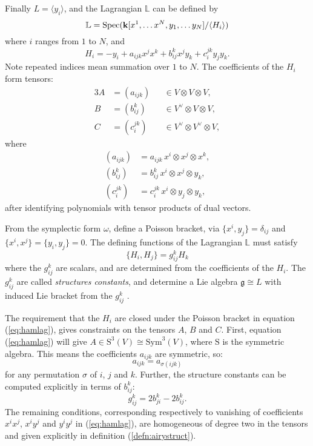     
    Finally \(L=\langle y_i \rangle \), and the Lagrangian \(\mathbb{L}\) can be defined by
    \[\mathbb{L}=\mathrm{Spec}( \mathbf{k}[x^1, \dots x^N, y_1, \dots y_N]/\langle H_i \rangle)\]
    where \(i \) ranges from \(1\) to \(N\), and
    \[ H_i=-y_i+a_{ijk}x^jx^k+b_{ij}^kx^jy_k+c_i^{jk}y_jy_k.
    \]
    Note repeated indices mean summation over \( 1\) to \(N\). The coefficients of the \(H_i\) form tensors:
    \begin{alignat*}{3}
    A &=(a_{ijk})  && \in V\otimes V\otimes V,\nonumber\\
    B &=(b_{ij}^k) && \in V^{\vee} \otimes V\otimes V,\\   
    C &=(c_i^{jk}) && \in V^{\vee} \otimes V^{\vee} \otimes V,\nonumber
    \end{alignat*}
    where 
    \begin{align*} 
    (a_{ijk}) &=a_{ijk}\,x^i\otimes x^j\otimes  x^k,\\ (b_{ij}^k)&=b_{ij}^k \,x^i \otimes x^j \otimes y_k, \\
    (c_i^{jk}) &=c_i^{jk}\,x^i \otimes y_j\otimes y_k , 
    \end{align*}
    after identifying polynomials with tensor products of dual vectors.
    
    From the symplectic form \(\omega\), define a Poisson bracket, via \( \{ x^i, y_j\}  = \delta_{ij}\) and \( \{ x^i,x^j\} = \{ y_i,y_j\} = 0\). The defining functions of the Lagrangian \( \mathbb{L}\) must satisfy
    \begin{equation}  \label{eq:hamlag}
    \{H_i,H_j\}=g_{ij}^kH_k
    \end{equation} 
    where the \(g_{ij}^k\) are scalars, and are determined from the coefficients of the \(H_i\). The \(g_{ij}^k\) are called \emph{structures constants}, and determine a Lie algebra \(\mathfrak{g} \cong L \) with induced Lie bracket from the \(g_{ij}^k\) . 

    The requirement that the \(H_i\) are closed under the Poisson bracket in equation (\ref{eq:hamlag}), gives constraints on the tensors \(A\), \(B\) and \(C\). First, equation (\ref{eq:hamlag}) will give \(A \in \mathrm{S}^3(V) \cong \mathrm{Sym}^3(V)\), where \(\mathrm{S}\) is the symmetric algebra. This means the coefficients \(a_{ijk}\) are symmetric, so:
    \[ a_{ijk} = a_{\sigma(ijk)}\]
    for any permutation \(\sigma\) of \(i\), \(j\) and \(k\). Further, the structure constants can be computed explicitly in terms of \(b_{ij}^k\): 
    \[g_{ij}^k=2b_{ji}^k-2b_{ij}^k.\] 
    The remaining conditions, corresponding respectively to vanishing of coefficients \( x^i x^j\), \( x^i y^j\) and \(y^i y^j\) in (\ref{eq:hamlag}), are homogeneous of degree two in the tensors and given explicitly in definition (\ref{defn:airystruct}).
    
